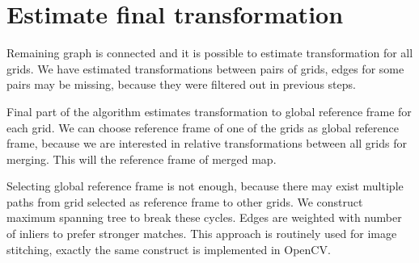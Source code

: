 
\section{Estimate final transformation} %
\label{sec:estimate_final_transformation}

Remaining graph is connected and it is possible to estimate transformation for all grids. We have estimated transformations between pairs of grids, edges for some pairs may be missing, because they were filtered out in previous steps.

Final part of the algorithm estimates transformation to global reference frame for each grid. We can choose reference frame of one of the grids as global reference frame, because we are interested in relative transformations between all grids for merging. This will the reference frame of merged map.

Selecting global reference frame is not enough, because there may exist multiple paths from grid selected as reference frame to other grids. We construct maximum spanning tree to break these cycles. Edges are weighted with number of inliers to prefer stronger matches. This approach is routinely used for image stitching, exactly the same construct is implemented in OpenCV.



